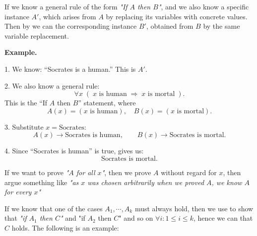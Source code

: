 If we know a general rule of the form \textit{"If $A$ then $B$"}, and we also know a specific instance \(A'\), which arises from \(A\) by replacing its variables with concrete values.  
Then by  we can  the corresponding instance \(B'\), obtained from \(B\) by the same variable replacement.  

\textbf{Example.}  

1. We know: ``Socrates is a human.'' This is \(A'\).  

2. We also know a general rule: 
\[
\forall x \; ( \; x \text{ is human} \;\Rightarrow\; x \text{ is mortal} \; ).
\]
This is the ``If $A$ then $B$'' statement, where
\[
A(x) = (x \text{ is human}), \quad B(x) = (x \text{ is mortal}).
\]

3. Substitute \(x = \text{Socrates}\):  
\[
A(x) \to \text{Socrates is human}, \qquad B(x) \to \text{Socrates is mortal}.
\]

4. Since ``Socrates is human'' is true,  gives us:  
\[
\text{Socrates is mortal}.
\]

If we want to prove \textit{"$A$ for all $x$"}, then we prove $A$ without regard for $x$, then argue something like \textit{"as $x$ was chosen arbitrarily when we proved $A$, we know $A$ for every $x$"}

If we know that one of the cases $A_1, \cdots, A_k$ must always hold, then we use  to show that \textit{"if $A_1$ then $C$"} and {"if $A_2$ then $C$"} and so on $\forall i:1 \leq i \leq k$, hence we can  that $C$ holds. The following is an example:




